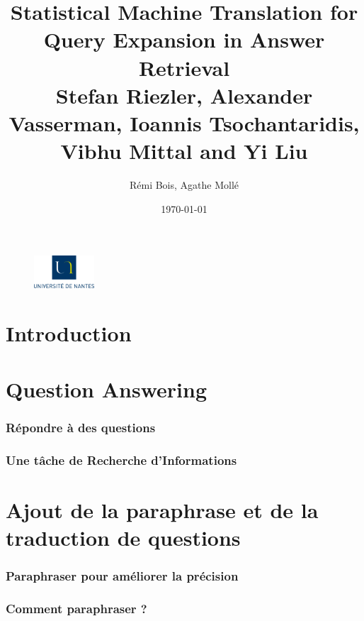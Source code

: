 \documentclass[10pt]{beamer}
\title{Statistical Machine Translation for Query Expansion in Answer
  Retrieval\\ 
\small
Stefan Riezler, Alexander Vasserman, Ioannis Tsochantaridis, Vibhu
Mittal and Yi Liu}
\author{Rémi Bois, Agathe Mollé}
\date{\today}
\begin{document}
\begin{frame}
  \maketitle
  \vfill
  \begin{figure}
    \includegraphics[width=0.20\textwidth]{logo_univ_nantes}
  \end{figure}

\end{frame}

\begin{frame}
  \tableofcontents
\end{frame}

\section{Introduction}
\label{sec:intro}


\section{Question Answering}
\label{sec:QA}

\begin{frame}
  \frametitle{Répondre à des questions}
\end{frame}

\begin{frame}
  \frametitle{Une tâche de Recherche d'Informations}
\end{frame}

\section{Ajout de la paraphrase et de la traduction de questions}
\label{sec:paratrans}

\begin{frame}
  \frametitle{Paraphraser pour améliorer la précision}
\end{frame}

\begin{frame}
  \frametitle{Comment paraphraser ?}
\end{frame}
\end{document}
